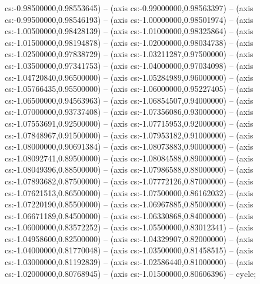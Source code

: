 cs:-0.98500000,0.98553645) -- (axis cs:-0.99000000,0.98563397) -- (axis cs:-0.99500000,0.98546193) -- (axis cs:-1.00000000,0.98501974) -- (axis cs:-1.00500000,0.98428139) -- (axis cs:-1.01000000,0.98325864) -- (axis cs:-1.01500000,0.98194878) -- (axis cs:-1.02000000,0.98034738) -- (axis cs:-1.02500000,0.97838729) -- (axis cs:-1.03211287,0.97500000) -- (axis cs:-1.03500000,0.97341753) -- (axis cs:-1.04000000,0.97034098) -- (axis cs:-1.04720840,0.96500000) -- (axis cs:-1.05284989,0.96000000) -- (axis cs:-1.05766435,0.95500000) -- (axis cs:-1.06000000,0.95227405) -- (axis cs:-1.06500000,0.94563963) -- (axis cs:-1.06854507,0.94000000) -- (axis cs:-1.07000000,0.93737408) -- (axis cs:-1.07356086,0.93000000) -- (axis cs:-1.07553691,0.92500000) -- (axis cs:-1.07715953,0.92000000) -- (axis cs:-1.07848967,0.91500000) -- (axis cs:-1.07953182,0.91000000) -- (axis cs:-1.08000000,0.90691384) -- (axis cs:-1.08073883,0.90000000) -- (axis cs:-1.08092741,0.89500000) -- (axis cs:-1.08084588,0.89000000) -- (axis cs:-1.08049396,0.88500000) -- (axis cs:-1.07986588,0.88000000) -- (axis cs:-1.07893682,0.87500000) -- (axis cs:-1.07772126,0.87000000) -- (axis cs:-1.07621513,0.86500000) -- (axis cs:-1.07500000,0.86162032) -- (axis cs:-1.07220190,0.85500000) -- (axis cs:-1.06967885,0.85000000) -- (axis cs:-1.06671189,0.84500000) -- (axis cs:-1.06330868,0.84000000) -- (axis cs:-1.06000000,0.83572252) -- (axis cs:-1.05500000,0.83012341) -- (axis cs:-1.04958600,0.82500000) -- (axis cs:-1.04329907,0.82000000) -- (axis cs:-1.04000000,0.81770048) -- (axis cs:-1.03500000,0.81458515) -- (axis cs:-1.03000000,0.81192839) -- (axis cs:-1.02586440,0.81000000) -- (axis cs:-1.02000000,0.80768945) -- (axis cs:-1.01500000,0.80606396) -- cycle;
